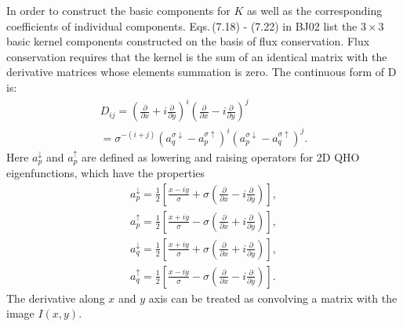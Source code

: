 \documentclass[apj]{emulateapj}
\begin{document}
In order to construct the basic components for $K$ as well as the
 corresponding coefficients of individual components. Eqs.\,(7.18) - (7.22) 
in BJ02 list the $3\times 3$ basic kernel components constructed on the
basis of flux conservation.  Flux conservation requires that the kernel is  
the sum of an identical matrix with the derivative matrices whose elements 
summation is zero. The continuous form of D is:
\begin{gather}
D_{ij}=(\frac{\partial}{\partial x}+i\frac{\partial}{\partial y})^i
       (\frac{\partial}{\partial x}-i\frac{\partial}{\partial y})^j\\
       =\sigma^{-(i+j)}(a_q^{\sigma\downarrow}-a_p^{\sigma\uparrow})^i(a_p^{\sigma\downarrow}-a_q^{\sigma\uparrow})^j.
\end{gather}
Here $a_{p}^{\downarrow}$ and $a_{p}^{\uparrow}$ are defined as
lowering and raising operators for 2D QHO eigenfunctions, which have
the properties
\begin{gather}
a_{p}^{\downarrow}=\frac{1}{2}[\frac{x-iy}{\sigma}+\sigma(\frac{\partial}{\partial x}-i\frac{\partial}{\partial y})],\\
a_{p}^{\uparrow}=\frac{1}{2}[\frac{x+iy}{\sigma}-\sigma(\frac{\partial}{\partial x}+i\frac{\partial}{\partial y})],\\
a_{q}^{\downarrow}=\frac{1}{2}[\frac{x+iy}{\sigma}+\sigma(\frac{\partial}{\partial x}+i\frac{\partial}{\partial y})],\\
a_{q}^{\uparrow}=\frac{1}{2}[\frac{x-iy}{\sigma}-\sigma(\frac{\partial}{\partial x}-i\frac{\partial}{\partial y})].
\end{gather}
The derivative along $x$ and $y$ axis can be treated as convolving a matrix with the image $I(x,y)$. 
\end{document}
